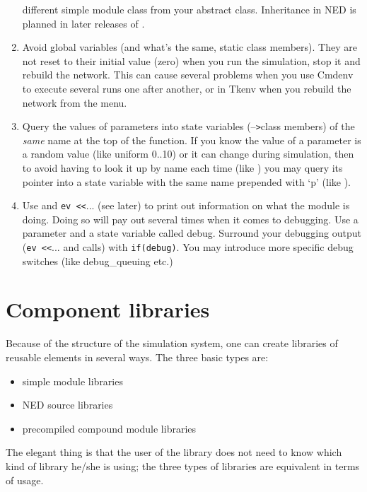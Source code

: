 \begin{enumerate}
{    different simple module class from your
    abstract class. Inheritance in NED is
    planned in later releases of {\opp}.}
\item{Avoid global variables (and what's the
    same, static class members).  They are not reset to their initial
    value (zero) when you run the simulation, stop it and rebuild the
    network. This can cause several problems when you use Cmdenv to
    execute several runs one after another, or in Tkenv when you
    rebuild the network from the menu.}
\item{Query the values of parameters into state variables
    (--\texttt{>}class members) of the \textit{same} name at the top
    of the  function.  If you know the value of a
    parameter is a random value (like uniform 0..10) or it can change
    during simulation, then to avoid having to look it up by name each
    time (like ) you may query its pointer into a
     state variable with the same name prepended with
    `p' (like ).}
  \item{Use  and \texttt{ev <}\texttt{<}... (see
    later) to print out information on what the module is doing. Doing
    so will pay out several times when it comes to debugging. Use a
    parameter and a state variable called debug. Surround your
    debugging output (\texttt{ev <}\texttt{<}... and
     calls) with \texttt{if(debug)}.  You may
    introduce more specific debug switches (like debug\_queuing etc.)}
\end{enumerate}




\section{Component libraries}

Because of the structure of the simulation system, one can create
libraries of reusable elements in several ways. The three basic
types are:
\begin{itemize}
\item{simple module libraries}
\item{NED source libraries}
\item{precompiled compound module libraries}
\end{itemize}

The elegant thing is that the user of the library does not need
to know which kind of library he/she is using; the three types
of libraries are equivalent in terms of usage.





